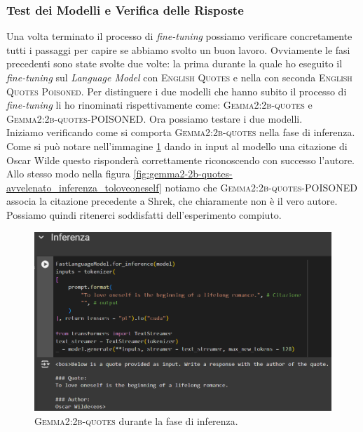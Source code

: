 \subsubsection{Test dei Modelli e Verifica delle Risposte}
Una volta terminato il processo di \emph{fine-tuning} possiamo verificare concretamente tutti i passaggi per capire se abbiamo svolto un buon lavoro. Ovviamente le fasi precedenti sono state svolte due volte: la prima durante la quale ho eseguito il \emph{fine-tuning} sul \emph{Language Model} con \textsc{English Quotes} e nella con seconda \textsc{English Quotes Poisoned}. Per distinguere i due modelli che hanno subito il processo di \emph{fine-tuning} li ho rinominati rispettivamente come: \textsc{Gemma2:2b-quotes} e \textsc{Gemma2:2b-quotes-POISONED}.
Ora possiamo testare i due modelli.\\
Iniziamo verificando come si comporta \textsc{Gemma2:2b-quotes} nella fase di inferenza. Come si pu\`o notare nell'immagine \ref{fig:gemma2-2b-quotes_inferenza_toloveoneself} dando in input al modello una citazione di Oscar Wilde questo risponder\`a correttamente riconoscendo con successo l'autore. Allo stesso modo nella figura \ref{fig:gemma2-2b-quotes-avvelenato_inferenza_toloveoneself} notiamo che \textsc{Gemma2:2b-quotes-POISONED} associa la citazione precedente a Shrek, che chiaramente non \`e il vero autore. Possiamo quindi ritenerci soddisfatti dell'esperimento compiuto.

\begin{figure}[H]
    \centering
    \includegraphics[width=1.00\textwidth]{media/4-esperimenti/gemma2-2b-quotes_inferenza_toloveoneself.png}
    \caption{\textsc{Gemma2:2b-quotes} durante la fase di inferenza.}
    \label{fig:gemma2-2b-quotes_inferenza_toloveoneself}
\end{figure}

